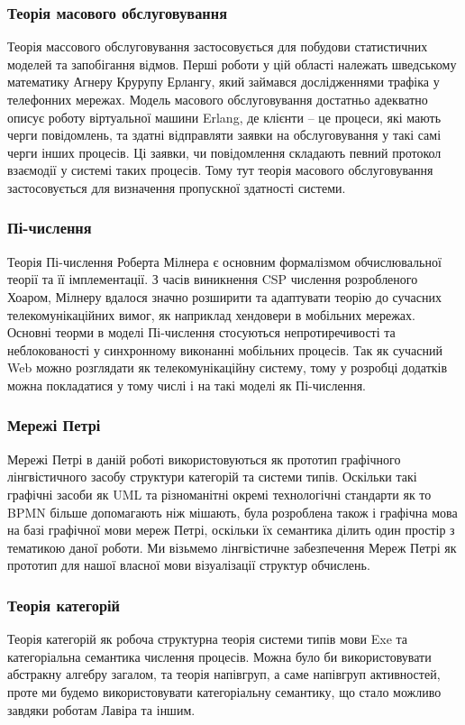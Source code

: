 \documentclass[11pt,oneside]{article}
\begin{document}
   \subsubsection*{Теорія масового обслуговування}
   Теорія массового обслуговування застосовується для побудови
   статистичних моделей та запобігання відмов. Перші роботи у цій області
   належать шведському математику Агнеру Крурупу Ерлангу, який займався
   дослідженнями трафіка у телефонних мережах. Модель масового обслуговування достатньо
   адекватно описує роботу віртуальної машини Erlang, де клієнти -- це процеси,
   які мають черги повідомлень, та здатні відправляти заявки на обслуговування
   у такі самі черги інших процесів. Ці заявки, чи повідомлення складають певний
   протокол взаємодії у системі таких процесів. Тому тут теорія масового обслуговування
   застосовується для визначення пропускної здатності системи.

   \subsubsection*{Пі-числення}
   Теорія Пі-числення Роберта Мілнера є основним формалізмом обчислювальної
   теорії та її імплементації. З часів виникнення CSP числення розробленого Хоаром,
   Мілнеру вдалося значно розширити та адаптувати теорію до сучасних
   телекомунікаційних вимог, як наприклад хендовери в мобільних мережах.
   Основні теорми в моделі Пі-числення стосуються непротиречивості та неблокованості
   у синхронному виконанні мобільних процесів. Так як сучасний Web можно розглядати
   як телекомунікаційну систему, тому у розробці додатків можна покладатися у тому
   числі і на такі моделі як Пі-числення.

   \subsubsection*{Мережі Петрі}
   Мережі Петрі в даній роботі використовуються як прототип графічного
   лінгвістичного засобу структури категорій та системи типів. Оскільки
   такі графічні засоби як UML та різноманітні окремі технологічні
   стандарти як то BPMN більше допомагають ніж мішають, була розроблена
   також і графічна мова на базі графічної мови мереж Петрі, оскільки їх
   семантика ділить один простір з тематикою даної роботи. Ми візьмемо
   лінгвістичне забезпечення Мереж Петрі як прототип для нашої власної
   мови візуалізації структур обчислень.

\newpage
   \subsubsection*{Теорія категорій}
   Теорія категорій як робоча структурна теорія системи типів мови Exe та
   категоріальна семантика числення процесів. Можна було би використовувати абстракну алгебру загалом,
   та теорія напівгруп, а саме напівгруп активностей, проте ми будемо використовувати
   категоріальну семантику, що стало можливо завдяки роботам Лавіра та іншим.\\
\end{document}
